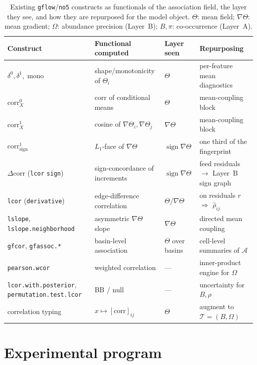 \documentclass[11pt]{article}
\theoremstyle{definition}
\theoremstyle{plain}
\theoremstyle{remark}
\newcommand{\sign}{\operatorname{sign}}
\newcommand{\mono}{\operatorname{mono}}
\newcommand{\1}{\mathbf{1}}
\newcommand{\Prec}{\Omega}
\newcommand{\Pres}{\pi}
\newcommand{\Edge}{B}
\newcommand{\Field}{\mathcal{A}}
\newcommand{\dcorr}{\Delta\mathrm{corr}}
\begin{document}
\begin{table}[t]\centering\small
\caption{Existing \texttt{gflow}/\texttt{no5} constructs as functionals of the
association field, the layer they see, and how they are repurposed for the model
object. $\Theta$: mean field; $\nabla\Theta$: mean gradient; $\Prec$: abundance
precision (Layer~B); $\Edge,\Pres$: co-occurrence (Layer~A).}
\label{tab:bridge}
\begin{tabular}{@{}lll l@{}}
\toprule
Construct & Functional computed & Layer seen & Repurposing \\
\midrule
$\delta^0,\delta^1,\mono$ & shape/monotonicity of $\Theta_i$ & $\Theta$ &
  per-feature mean diagnostics \\
$\mathrm{corr}^0_X$ & corr of conditional means & $\Theta$ & mean-coupling block \\
$\mathrm{corr}^1_X$ & cosine of $\nabla\Theta_i,\nabla\Theta_j$ & $\nabla\Theta$ &
  mean-coupling block \\
$\mathrm{corr}^1_{\mathrm{sign}}$ & $L_1$-face of $\nabla\Theta$ & $\sign\nabla\Theta$ &
  one third of the fingerprint \\
$\dcorr$ (\texttt{lcor} \texttt{sign}) & sign-concordance of increments &
  $\sign\nabla\Theta$ & feed residuals $\to$ Layer~B sign graph \\
\texttt{lcor} (\texttt{derivative}) & edge-difference correlation & $\Theta$/$\nabla\Theta$ &
  on residuals $r$ $\Rightarrow$ $\widehat\rho_{ij}$ \\
\texttt{lslope}, \texttt{lslope.neighborhood} & asymmetric $\nabla\Theta$ slope &
  $\nabla\Theta$ & directed mean coupling \\
\texttt{gfcor}, \texttt{gfassoc.*} & basin-level association & $\Theta$ over basins &
  cell-level summaries of $\Field$ \\
\texttt{pearson.wcor} & weighted correlation & --- & inner-product engine for $\Prec$ \\
\texttt{lcor.with.posterior}, \texttt{permutation.test.lcor} & BB / null &
  --- & uncertainty for $\Edge,\rho$ \\
correlation typing & $x\mapsto[\mathrm{corr}]_{ij}$ & $\Theta$ &
  augment to $\mathcal{T}=(\Edge,\Prec)$ \\
\bottomrule
\end{tabular}
\end{table}

\section{Experimental program}\label{sec:exp}
\end{document}
